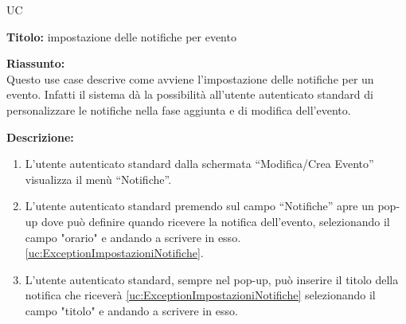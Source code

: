 \begin{listaPersonale}{UC}
    \newpage


    \begin{center}
        
    \end{center}

    \textbf{Titolo:} impostazione delle notifiche per evento

    \textbf{Riassunto:} \\
    Questo use case descrive come avviene l'impostazione delle notifiche per un evento. Infatti il sistema dà la possibilità all'utente autenticato standard di personalizzare le notifiche nella fase aggiunta e di modifica dell'evento.

    \textbf{Descrizione:}
    \begin{enumerate}
        \item L'utente autenticato standard dalla schermata “Modifica/Crea Evento” visualizza il menù “Notifiche”.
        \item L'utente autenticato standard premendo sul campo “Notifiche” apre un pop-up dove può definire quando ricevere la notifica dell'evento, selezionando il campo "orario" e andando a scrivere in esso. \ref{uc:ExceptionImpostazioniNotifiche}.
        \item L'utente autenticato standard, sempre nel pop-up, può inserire il titolo della notifica che riceverà \ref{uc:ExceptionImpostazioniNotifiche} selezionando il campo "titolo" e andando a scrivere in esso.
    \end{enumerate}


\end{listaPersonale}
